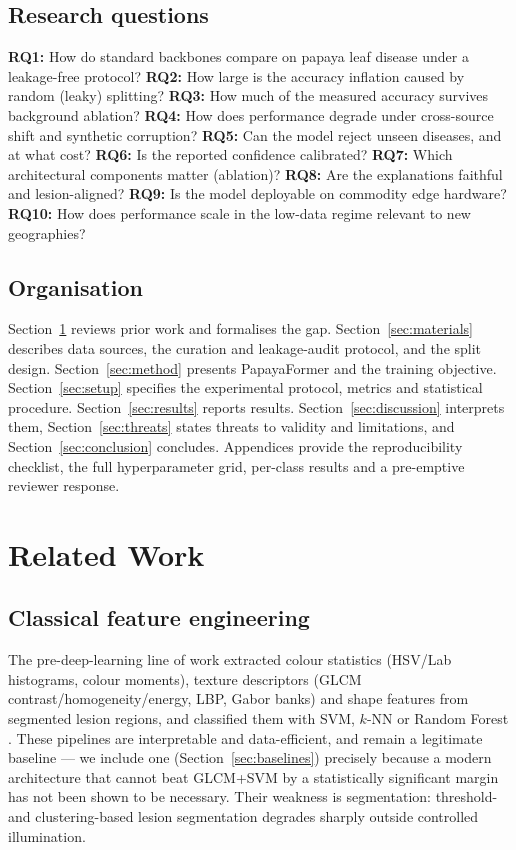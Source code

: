 \documentclass[10pt,twocolumn,a4paper]{article}
\begin{document}
\subsection{Research questions}
\textbf{RQ1:} How do standard backbones compare on papaya leaf disease under a leakage-free protocol?
\textbf{RQ2:} How large is the accuracy inflation caused by random (leaky) splitting?
\textbf{RQ3:} How much of the measured accuracy survives background ablation?
\textbf{RQ4:} How does performance degrade under cross-source shift and synthetic corruption?
\textbf{RQ5:} Can the model reject unseen diseases, and at what cost?
\textbf{RQ6:} Is the reported confidence calibrated?
\textbf{RQ7:} Which architectural components matter (ablation)?
\textbf{RQ8:} Are the explanations faithful and lesion-aligned?
\textbf{RQ9:} Is the model deployable on commodity edge hardware?
\textbf{RQ10:} How does performance scale in the low-data regime relevant to new geographies?

\subsection{Organisation}
Section~\ref{sec:related} reviews prior work and formalises the gap. Section~\ref{sec:materials} describes data sources, the curation and leakage-audit protocol, and the split design. Section~\ref{sec:method} presents PapayaFormer and the training objective. Section~\ref{sec:setup} specifies the experimental protocol, metrics and statistical procedure. Section~\ref{sec:results} reports results. Section~\ref{sec:discussion} interprets them, Section~\ref{sec:threats} states threats to validity and limitations, and Section~\ref{sec:conclusion} concludes. Appendices provide the reproducibility checklist, the full hyperparameter grid, per-class results and a pre-emptive reviewer response.
\section{Related Work}
\label{sec:related}

\subsection{Classical feature engineering}
The pre-deep-learning line of work extracted colour statistics (HSV/Lab histograms, colour moments), texture descriptors (GLCM contrast/homogeneity/energy, LBP, Gabor banks) and shape features from segmented lesion regions, and classified them with SVM, $k$-NN or Random Forest \cite{classical_review}. These pipelines are interpretable and data-efficient, and remain a legitimate baseline --- we include one (Section~\ref{sec:baselines}) precisely because a modern architecture that cannot beat GLCM+SVM by a statistically significant margin has not been shown to be necessary. Their weakness is segmentation: threshold- and clustering-based lesion segmentation degrades sharply outside controlled illumination.
\end{document}
